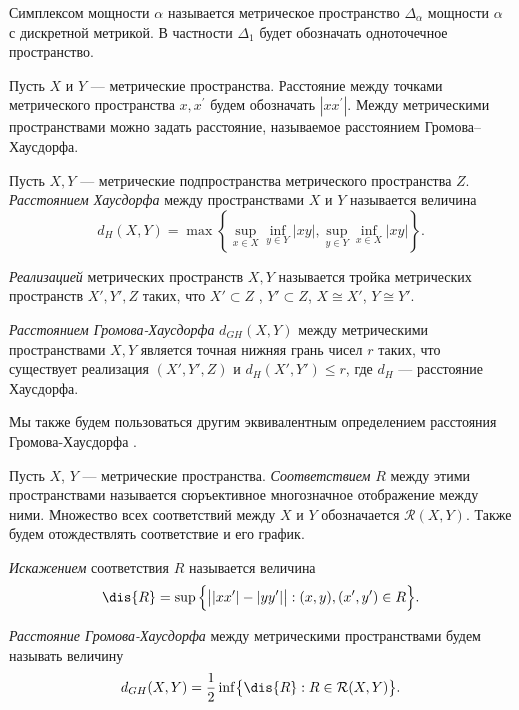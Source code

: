 \begin{definition}[Симплекс]
  Симплексом мощности \( \alpha \) называется метрическое
  пространство \( \Delta _
  \alpha  \) мощности \( \alpha  \) с дискретной метрикой. В
  частности \( \Delta _1 \) будет обозначать одноточечное пространство.
\end{definition}
Пусть $X$ и $Y$ ---
метрические пространства. Расстояние между точками метрического
пространства \( x, x^\prime \) будем обозначать \( | xx^\prime | \).
Между метрическими пространствами можно задать расстояние, называемое
расстоянием Громова--Хаусдорфа.
\begin{definition}
  Пусть \( X,Y \) --- метрические подпространства метрического
  пространства \( Z \). \emph{Расстоянием Хаусдорфа} между
  пространствами \( X \) и \( Y \) называется величина
  \[
    d_H(X,Y) = \max \left\{\sup_{x\in X}\inf_{y\in Y} | xy |,
    \sup_{y\in Y}\inf_{x\in X} | xy |\right\}.
  \]
\end{definition}
\begin{definition}
  \emph{Реализацией} метрических пространств \( X, Y \) называется
  тройка метрических пространств \( X', Y', Z \) таких, что \( X'
  \subset Z \) , \( Y' \subset Z \), \( X \cong X' \), \( Y \cong Y' \).

  \emph{Расстоянием Громова-Хаусдорфа}  $d_{GH}(X,Y)$ между метрическими
  пространствами $X, Y$ является точная нижняя  грань чисел $r$
  таких, что существует реализация $(X',Y',Z)$ и $d_H(X', Y')  \le
  r$, где $d_H$ --- расстояние Хаусдорфа.
\end{definition}
Мы также будем пользоваться другим эквивалентным определением
расстояния Громова-Хаусдорфа \cite{Lectures}.
\begin{definition}[Соответствие]
  Пусть $X$, $Y$ --- метрические пространства. \emph{Соответствием}
  $R$ между этими пространствами
  называется сюръективное многозначное отображение между ними.
  Множество всех соответствий между $X$ и $Y$ обозначается
  $\mathcal{R}(X,Y)$. Также будем отождествлять соответствие и его
  график.

  \emph{Искажением} соответствия \( R \) называется величина
  \[
    \dis{R} = \sup{\Bigl\{ \big| |xx'| - |yy'| \big| : (x, y), (x',
    y') \in R\Bigr\}}.
  \]
\end{definition}
\begin{definition}
  \emph{Расстояние Громова-Хаусдорфа} между метрическими
  пространствами будем называть величину
  \[
    d_{GH}(X,Y) = \frac{1}{2}\inf \bigl\{\dis{R} : R \in
    \mathcal{R}(X,Y)\bigr\}.
  \]
\end{definition}
